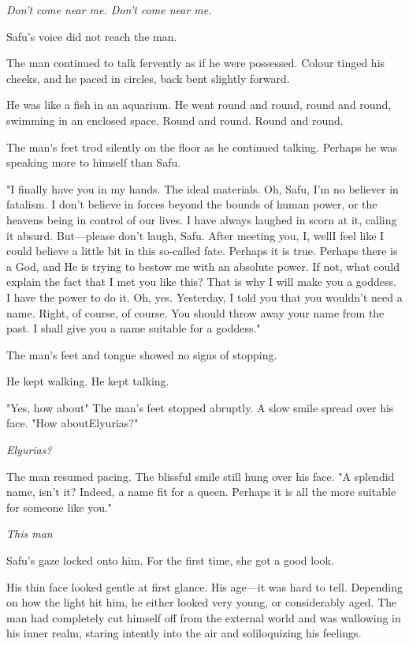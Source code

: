 \emph{Don't come near me. Don't come near me.}

Safu's voice did not reach the man.

The man continued to talk fervently as if he were possessed. Colour
tinged his cheeks, and he paced in circles, back bent slightly forward.

He was like a fish in an aquarium. He went round and round, round and
round, swimming in an enclosed space. Round and round. Round and round.

The man's feet trod silently on the floor as he continued talking.
Perhaps he was speaking more to himself than Safu.

"I finally have you in my hands. The ideal materials. Oh, Safu, I'm no
believer in fatalism. I don't believe in forces beyond the bounds of
human power, or the heavens being in control of our lives. I have always
laughed in scorn at it, calling it absurd. But---please don't laugh, Safu.
After meeting you, I, well\el I feel like I could believe a little bit
in this so-called fate. Perhaps it is true. Perhaps there is a God, and
He is trying to bestow me with an absolute power. If not, what could
explain the fact that I met you like this? That is why I will make you a
goddess. I have the power to do it. Oh, yes. Yesterday, I told you that
you wouldn't need a name. Right, of course, of course. You should throw
away your name from the past. I shall give you a name suitable for a
goddess."

The man's feet and tongue showed no signs of stopping.

He kept walking. He kept talking.

"Yes, how about\el " The man's feet stopped abruptly. A slow smile spread
over his face. "How about\el Elyurias?"

\emph{Elyurias?}

The man resumed pacing. The blissful smile still hung over his face. "A
splendid name, isn't it? Indeed, a name fit for a queen. Perhaps it is
all the more suitable for someone like you."

\emph{This man\el }

Safu's gaze locked onto him. For the first time, she got a good look.

His thin face looked gentle at first glance. His age---it was hard to
tell. Depending on how the light hit him, he either looked very young,
or considerably aged. The man had completely cut himself off from the
external world and was wallowing in his inner realm, staring intently
into the air and soliloquizing his feelings.

